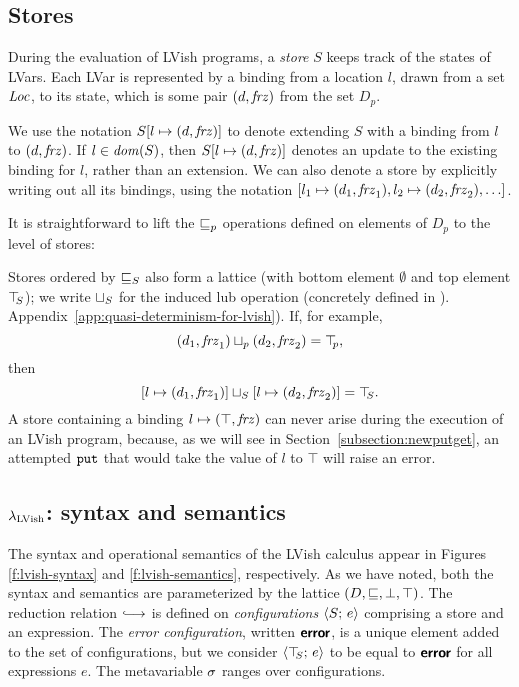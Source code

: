 \subsection{Stores}

During the evaluation of LVish programs, a \emph{store} $S$ keeps
track of the states of LVars.  Each LVar is represented by a binding
from a location $l$, drawn from a set $\mathit{Loc}$, to its state, which is
some pair $(d, \mathit{frz})$ from the set $D_p$.

\DefStore

\noindent We use the notation $S[l \mapsto (d, \mathit{frz})]$ to denote
extending $S$ with a binding from $l$ to $(d, \mathit{frz})$.  If $l \in
\mathit{dom}(S)$, then $S[l \mapsto (d, \mathit{frz})]$ denotes an update to the
existing binding for $l$, rather than an extension.  We can also
denote a store by explicitly writing out all its bindings, using the
notation $\store{\storebinding{l_1}{d_1}{\status_1},
  \storebinding{l_2}{d_2}{\status_2}, \dots}$.

It is straightforward to lift the $\sqsubseteq_p$ operations
defined on elements of $D_p$ to the level of stores:

\DefLeqStore


\noindent
Stores ordered by $ \sqsubseteq_S $ also form a lattice (with bottom element
$\emptyset$ and top element $\top\hspace{-0.85mm}_{S}$); we write $ \sqcup_{S} $ for the induced
lub operation (concretely defined in 
\ifx\fulltr\undefined
\cite{Freeze-TR}).
\else
Appendix~\ref{app:quasi-determinism-for-lvish}).
\fi
If, for example,
\[ (d_1, \mathit{frz}_1) \sqcup_p (d_2, \mathit{frz}_2) = \top\hspace{-0.85mm}_{p}, \]
then
\[ \left[ l \mapsto (d_1, \mathit{frz}_1) \right] \sqcup_{S} \left[ l \mapsto (d_2, \mathit{frz}_2) \right] =
\top\hspace{-0.85mm}_{S}. \] 
A store containing a binding $l \mapsto (\top, \mathit{frz})$ can
never arise during the execution of an LVish program, because, as we will see
in Section~\ref{subsection:newputget}, an attempted $\mbox{\texttt{put}}$ that would take the
value of $l$ to $\top$ will raise an error.

\subsection{$\lambda_{\textrm{LVish}}$: syntax and semantics}

\FigLambdaLVishGrammar[t]

\FigLambdaLVishSemantics[t]

The syntax and operational semantics of the LVish calculus appear in Figures
\ref{f:lvish-syntax} and \ref{f:lvish-semantics}, respectively.  As we
have noted, both the syntax and semantics are parameterized by the
lattice $(D, \sqsubseteq, \bot, \top)$.  The reduction relation $\parstepsto$ is
defined on \emph{configurations} $\langle S;\, e \rangle$ comprising a store
and an expression.  The \emph{error configuration}, written $\textbf{\textsf{error}}$,
is a unique element added to the set of configurations, but we
consider $\langle \top\hspace{-0.85mm}_{S};\, e \rangle$ to be equal to $\textbf{\textsf{error}}$ for all
expressions $e$.  The metavariable $\sigma$ ranges over configurations.

